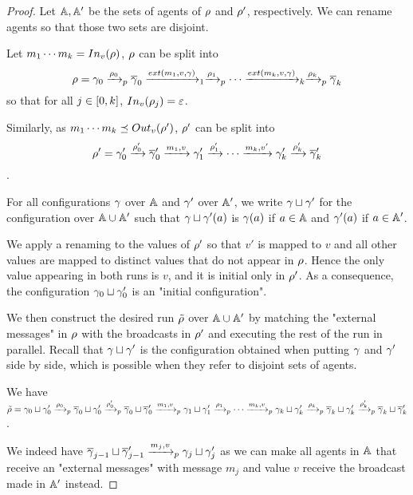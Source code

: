 \begin{proof}
	Let $\mathbb{A}, \mathbb{A}'$ be the sets of agents of $\rho$ and $\rho'$, respectively.
	We can rename agents so that those two sets are disjoint.
	
	Let $m_1 \cdots m_k = \vinput{v}{\run}$, $\rho$ can be split into \[ \run = \config_0 \pstep{\run_0} \overline{\config}_0 \extbr{m_1,v} \config_{1} \pstep{\run_1} \cdots \extbr{m_k,v} \config_{k} \pstep{\run_k} \overline{\config}_k\] 
	so that for all $j\in [0,k]$, $\vinput{v}{\run_j} = \varepsilon$.
	
	Similarly, as $m_1\cdots m_k \subword \voutput{v}{\run'}$, $\rho'$ can be split into \[\rho' = \gamma'_0 \xrightarrow{\rho'_0} \overline{\gamma}'_0 \xrightarrow{m_1, v} \gamma'_{1} \xrightarrow{\rho'_1} \cdots \xrightarrow{m_k,v'} \gamma'_{k} \xrightarrow{\rho'_k} \overline{\gamma}'_k \].
	
	For all configurations $\gamma$ over $\mathbb{A}$ and $\gamma'$ over $\mathbb{A}'$, we write $\gamma \sqcup \gamma'$ for the configuration over $\mathbb{A} \cup \mathbb{A}'$ such that $\gamma \sqcup \gamma'(a)$ is $\gamma(a)$ if $a \in \mathbb{A}$ and $\gamma'(a)$ if $a \in \mathbb{A}'$.
	
	We apply a renaming to the values of $\rho'$ so that $v'$ is mapped to $v$ and all other values are mapped to distinct values that do not appear in $\rho$.
	Hence the only value appearing in both runs is $v$, and it is initial only in $\rho'$. As a consequence, the configuration $\gamma_0 \sqcup \gamma'_0$ is an "initial configuration".
	
	We then construct the desired run $\Tilde{\rho}$ over $\mathbb{A} \cup \mathbb{A}'$ by matching the "external messages" in $\rho$ with the broadcasts in $\rho'$ and executing the rest of the run in parallel. Recall that $\gamma \sqcup \gamma'$ is the configuration obtained when putting $\gamma$ and $\gamma'$ side by side, which is possible when they refer to disjoint sets of agents. 
	
	We have $\Tilde{\rho} = \gamma_0 \sqcup \gamma'_0 \xrightarrow{\rho_0}_{p} \overline{\gamma}_0 \sqcup \gamma'_0 \xrightarrow{\rho'_0}_{p} \overline{\gamma}_0 \sqcup \overline{\gamma}'_0 \xrightarrow{m_1, v}_{p} \gamma_{1} \sqcup \gamma'_1 \xrightarrow{\rho_1}_{p} \cdots \xrightarrow{m_k,v}_{p} \gamma_{k}  \sqcup \gamma'_{k} \xrightarrow{\rho_k}_{p}  \overline{\gamma}_k \sqcup \gamma'_k \xrightarrow{\rho'_k}_{p} \overline{\gamma}_k \sqcup \overline{\gamma}'_k$.
	
	We indeed have $\overline{\gamma}_{j-1} \sqcup \overline{\gamma}'_{j-1} \xrightarrow{m_j, v}_{p} \gamma_{j} \sqcup \gamma'_j$ as we can make all agents in $\mathbb{A}$ that receive an "external messages" with message $m_j$ and value $v$ receive the broadcast made in $\mathbb{A}'$ instead.
	

\end{proof}
